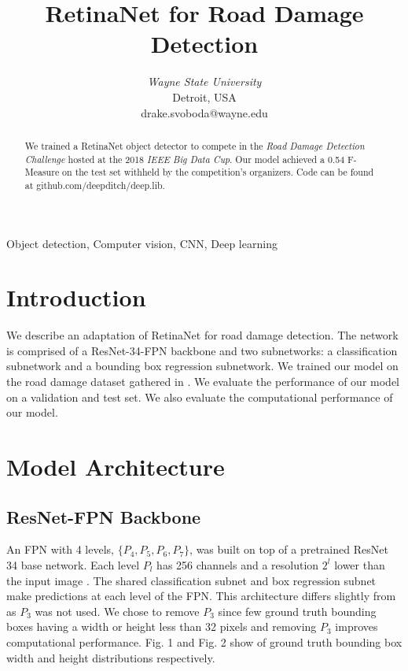 \documentclass[conference]{IEEEtran}
\begin{document}
\title{RetinaNet for Road Damage Detection}


\author{
\textit{Wayne State University}\\
Detroit, USA \\
drake.svoboda@wayne.edu}

\maketitle

\begin{abstract}
We trained a RetinaNet object detector to compete in the \textit{Road Damage Detection Challenge} hosted at the 2018 \textit{IEEE Big Data Cup}. Our model achieved a 0.54 F-Measure on the test set withheld by the competition's organizers. Code can be found at github.com/deepditch/deep.lib.
\end{abstract}

\begin{IEEEkeywords}
Object detection, Computer vision, CNN, Deep learning
\end{IEEEkeywords}

\section{Introduction}
We describe an adaptation of RetinaNet \cite{retinanet} for road damage detection. The network is comprised of a ResNet-34-FPN backbone and two subnetworks: a classification subnetwork and a bounding box regression subnetwork. We trained our model on the road damage dataset gathered in \cite{damage}. We evaluate the performance of our model on a validation and test set. We also evaluate the computational performance of our model. 

\section{Model Architecture}

\subsection{ResNet-FPN Backbone}

An FPN with 4 levels, $\{P_4, P_5, P_6, P_7\}$, was built on top of a pretrained ResNet 34 base network. Each level $P_l$ has 256 channels and a resolution $2^l$ lower than the input image \cite{fpn}. The shared classification subnet and box regression subnet make predictions at each level of the FPN. This architecture differs slightly from \cite{retinanet} as $P_3$ was not used. We chose to remove $P_3$ since few ground truth bounding boxes having a width or height less than 32 pixels and removing $P_3$ improves computational performance. Fig. 1 and Fig. 2 show of ground truth bounding box width and height distributions respectively.
\end{document}
